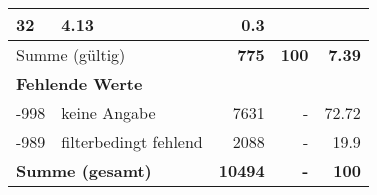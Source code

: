 \begin{longtable}{lXrrr}
       \num{32} &
       \num[round-mode=places,round-precision=2]{4.13} &
         \num[round-mode=places,round-precision=2]{0.3} \\
     \midrule
     \multicolumn{2}{l}{Summe (gültig)} &
       \textbf{\num{775}} &
     \textbf{\num{100}} &
       \textbf{\num[round-mode=places,round-precision=2]{7.39}} \\
     \multicolumn{5}{l}{\textbf{Fehlende Werte}}\\
       -998 &
       keine Angabe &
         \num{7631} &
        - &
         \num[round-mode=places,round-precision=2]{72.72} \\
       -989 &
       filterbedingt fehlend &
         \num{2088} &
        - &
         \num[round-mode=places,round-precision=2]{19.9} \\
     \midrule
     \multicolumn{2}{l}{\textbf{Summe (gesamt)}} &
          \textbf{\num{10494}} &
        \textbf{-} &
        \textbf{\num{100}} \\
     \bottomrule
     \end{longtable}
     
